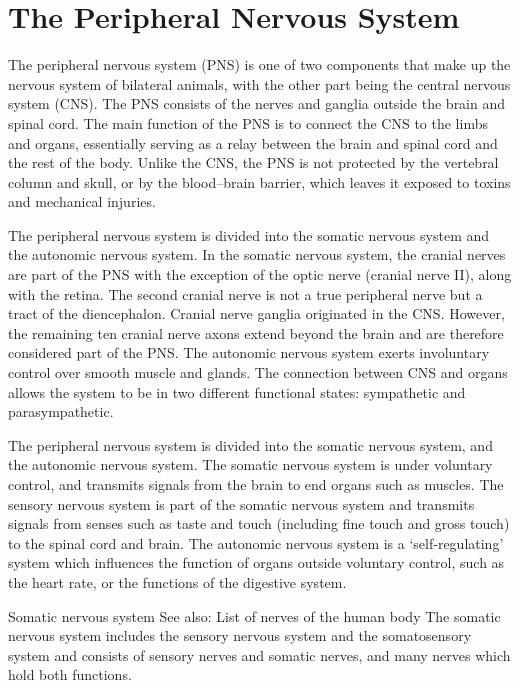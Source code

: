 \documentclass[]{book}
\begin{document}
\hypertarget{the-peripheral-nervous-system}{%
\chapter{The Peripheral Nervous System}\label{the-peripheral-nervous-system}}

The peripheral nervous system (PNS) is one of two components that make up the nervous system of bilateral animals, with the other part being the central nervous system (CNS). The PNS consists of the nerves and ganglia outside the brain and spinal cord. The main function of the PNS is to connect the CNS to the limbs and organs, essentially serving as a relay between the brain and spinal cord and the rest of the body. Unlike the CNS, the PNS is not protected by the vertebral column and skull, or by the blood--brain barrier, which leaves it exposed to toxins and mechanical injuries.

The peripheral nervous system is divided into the somatic nervous system and the autonomic nervous system. In the somatic nervous system, the cranial nerves are part of the PNS with the exception of the optic nerve (cranial nerve II), along with the retina. The second cranial nerve is not a true peripheral nerve but a tract of the diencephalon. Cranial nerve ganglia originated in the CNS. However, the remaining ten cranial nerve axons extend beyond the brain and are therefore considered part of the PNS. The autonomic nervous system exerts involuntary control over smooth muscle and glands. The connection between CNS and organs allows the system to be in two different functional states: sympathetic and parasympathetic.

The peripheral nervous system is divided into the somatic nervous system, and the autonomic nervous system. The somatic nervous system is under voluntary control, and transmits signals from the brain to end organs such as muscles. The sensory nervous system is part of the somatic nervous system and transmits signals from senses such as taste and touch (including fine touch and gross touch) to the spinal cord and brain. The autonomic nervous system is a `self-regulating' system which influences the function of organs outside voluntary control, such as the heart rate, or the functions of the digestive system.

Somatic nervous system
See also: List of nerves of the human body
The somatic nervous system includes the sensory nervous system and the somatosensory system and consists of sensory nerves and somatic nerves, and many nerves which hold both functions.
\end{document}
